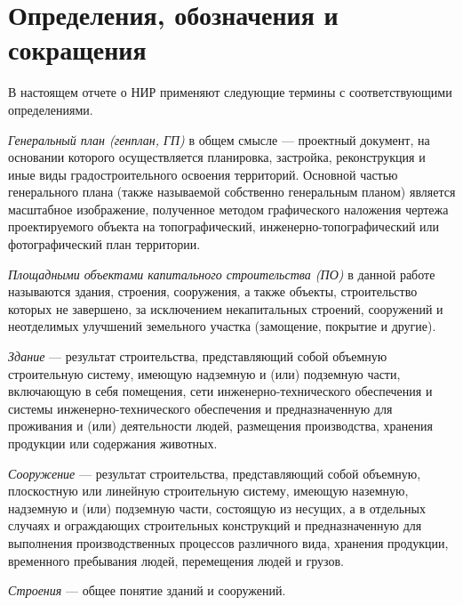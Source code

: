 \section*{\Large{Определения, обозначения и сокращения}}

В настоящем отчете о НИР применяют следующие термины с соответствующими определениями.

\textit{Генеральный план (генплан, ГП)} в общем смысле —
проектный документ, на основании которого осуществляется планировка,
застройка, реконструкция и иные виды градостроительного освоения территорий.
Основной частью генерального плана (также называемой собственно генеральным планом)
является масштабное изображение, полученное методом графического наложения чертежа
проектируемого объекта на топографический,
инженерно-топографический или фотографический план территории.


\textit{Площадными объектами капитального строительства (ПО)} в данной работе называются
здания, строения, сооружения, а также объекты, строительство которых не завершено, за исключением некапитальных строений,
сооружений и неотделимых улучшений земельного участка (замощение, покрытие и другие).


\textit{Здание} — результат строительства, представляющий собой объемную строительную систему,
имеющую надземную и (или) подземную части, включающую в себя помещения,
сети инженерно-технического обеспечения и системы инженерно-технического обеспечения и предназначенную для проживания и
(или) деятельности людей, размещения производства, хранения продукции или содержания животных.


\textit{Сооружение} — результат строительства,
представляющий собой объемную, плоскостную или линейную строительную систему,
имеющую наземную, надземную и (или) подземную части, состоящую из несущих,
а в отдельных случаях и ограждающих строительных конструкций и предназначенную для выполнения
производственных процессов различного вида, хранения продукции, временного пребывания людей, перемещения людей и грузов.


\textit{Строения} — общее понятие зданий и сооружений.
\newpage